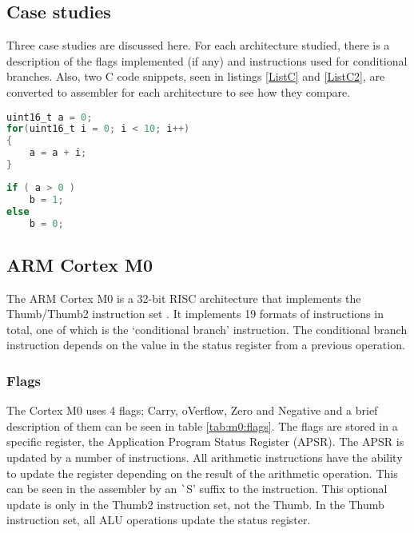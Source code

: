 \documentclass[12pt,a4paper]{article}
\begin{document}
\begin{bibunit}[is-unsrt]
\section{Case studies}

Three case studies are discussed here. 
For each architecture studied, there is a description of the flags implemented (if any) and instructions used for conditional branches. 
Also, two C code snippets, seen in listings \ref{ListC} and \ref{ListC2}, are converted to assembler for each architecture to see how they compare.
\begin{lstlisting}[frame=single,caption=C Code,language=C,label=ListC]
uint16_t a = 0;
for(uint16_t i = 0; i < 10; i++)
{
	a = a + i;
}
\end{lstlisting}
\begin{lstlisting}[frame=single,caption=C Code,language=C,label=ListC2]
if ( a > 0 )
	b = 1;
else
	b = 0;
\end{lstlisting}
\subsection{ARM Cortex M0}

The ARM Cortex M0 is a 32-bit RISC architecture that implements the Thumb/Thumb2 instruction set \cite{ARM:CortexM0}. 
It implements 19 formats of instructions in total, one of which is the `conditional branch' instruction. 
The conditional branch instruction depends on the value in the status register from a previous operation.

\subsubsection{Flags}
The Cortex M0 uses 4 flags; Carry, oVerflow, Zero and Negative \cite{ARM:Flags} and a brief description of them can be seen in table \ref{tab:m0:flags}.
The flags are stored in a specific register, the Application Program Status Register (APSR). 
The APSR is updated by a number of instructions. 
All arithmetic instructions have the ability to update the register depending on the result of the arithmetic operation. 
This can be seen in the assembler by an {\texttt `S'} suffix to the instruction.
This optional update is only in the Thumb2 instruction set, not the Thumb.
In the Thumb instruction set, all ALU operations update the status register.


\end{bibunit}
\end{document}

